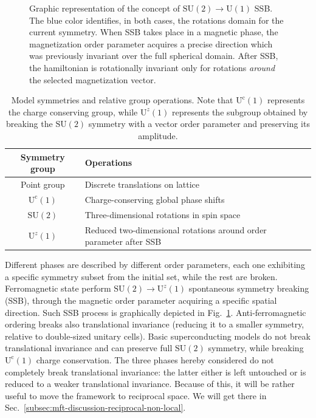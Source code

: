 \begin{figure}
	\centering
	\hspace{2em}
	\caption{Graphic representation of the concept of $\mathrm{SU}(2)\to\mathrm{U}(1)$ SSB. The blue color identifies, in both cases, the rotations domain for the current symmetry. When SSB takes place in a magnetic phase, the magnetization order parameter acquires a precise direction which was previously invariant over the full spherical domain. After SSB, the hamiltonian is rotationally invariant only for rotations \textit{around} the selected magnetization vector.}
	\label{fig:su2-u1-domains}
\end{figure}

\begin{table}
	\centering
	\begin{tabular}{c l}
		\textbf{Symmetry group} & \textbf{Operations} \\
		\midrule
		Point group & Discrete translations on lattice \\
		$\mathrm{U}^\mathrm{c}(1)$ & Charge-conserving global phase shifts \\
		$\mathrm{SU}(2)$ & Three-dimensional rotations in spin space \\
		$\mathrm{U}^z(1)$ & Reduced two-dimensional rotations around order parameter after SSB \\
		\midrule
	\end{tabular}
	\caption{Model symmetries and relative group operations. Note that $\mathrm{U}^\mathrm{c}(1)$ represents the charge conserving group, while $\mathrm{U}^z(1)$ represents the subgroup obtained by breaking the $\mathrm{SU}(2)$ symmetry with a vector order parameter and preserving its amplitude.}
	\label{tab:symmetry-groups}
\end{table}

Different phases are described by different order parameters, each one exhibiting a specific symmetry subset from the initial set, while the rest are broken. Ferromagnetic state perform $\mathrm{SU}(2) \to \mathrm{U}^z(1)$ spontaneous symmetry breaking (SSB), through the magnetic order parameter acquiring a specific spatial direction. Such SSB process is graphically depicted in Fig.~\ref{fig:su2-u1-domains}. Anti-ferromagnetic ordering breaks also translational invariance (reducing it to a smaller symmetry, relative to double-sized unitary cells). Basic superconducting models do not break translational invariance and can preserve full $\mathrm{SU}(2)$ symmetry, while breaking $\mathrm{U}^\mathrm{c}(1)$ charge conservation. The three phases hereby considered do not completely break translational invariance: the latter either is left untouched or is reduced to a weaker translational invariance. Because of this, it will be rather useful to move the framework to reciprocal space. We will get there in Sec.~\ref{subsec:mft-discussion-reciprocal-non-local}.

